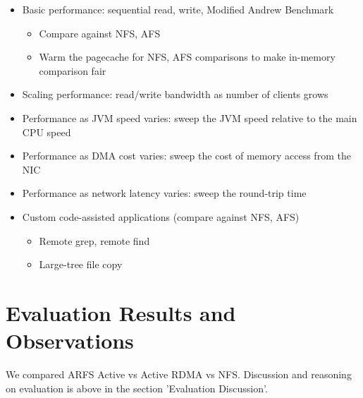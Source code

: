 \documentclass[10pt]{article}
\begin{document}
\begin{itemize}
\item Basic performance: sequential read, write, Modified Andrew
  Benchmark
\begin{itemize}
\item Compare against NFS, AFS
\item Warm the pagecache for NFS, AFS comparisons to make in-memory
  comparison fair
\end{itemize}
\item Scaling performance: read/write bandwidth as number of clients grows
\item Performance as JVM speed varies: sweep the JVM speed relative to
  the main CPU speed
\item Performance as DMA cost varies: sweep the cost of memory access
  from the NIC
\item Performance as network latency varies: sweep the round-trip time
\item Custom code-assisted applications (compare against NFS, AFS)
\begin{itemize}
\item Remote grep, remote find
\item Large-tree file copy
\end{itemize}
\end{itemize}

\section{Evaluation Results and Observations}
We compared ARFS Active vs Active RDMA vs NFS. Discussion and reasoning 
on evaluation is above in the section 'Evaluation Discussion'.
\end{document}

